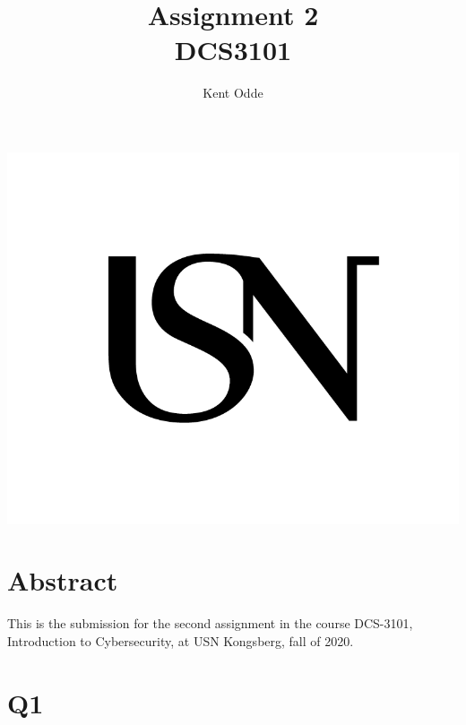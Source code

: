 \documentclass{article}
\begin{document}
\author{Kent Odde}
\title{Assignment 2 \\DCS3101}

\maketitle
\thispagestyle{empty}
\begin{center}
\includegraphics[width=\linewidth,height=0.2\textheight,keepaspectratio]{img/USN.png}
\end{center}
\newpage

\tableofcontents

\newpage

\section{Abstract}

This is the submission for the second assignment in the course DCS-3101, Introduction to Cybersecurity, at USN Kongsberg, fall of 2020.

\section{Q1}
\end{document}
